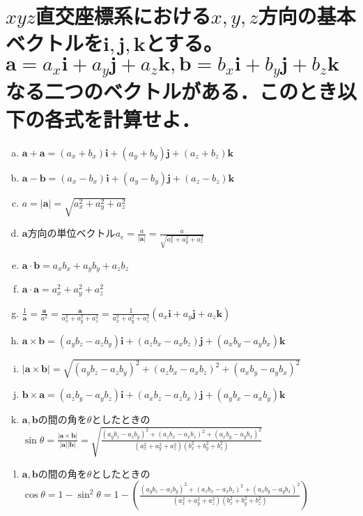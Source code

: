 \documentclass[dvipdfmx]{ujarticle}
\begin{document}
\section{$xyz$直交座標系における$x, y, z$方向の基本ベクトルを$\boldsymbol{i}, \boldsymbol{j}, \boldsymbol{k}$とする。$\boldsymbol{a}=a_{x}\boldsymbol{i}+a_{y}\boldsymbol{j}+a_{z}\boldsymbol{k}, \boldsymbol{b}=b_{x}\boldsymbol{i}+ b_{y}\boldsymbol{j}+ b_{z}\boldsymbol{k}$なる二つのベクトルがある．このとき以下の各式を計算せよ．}
\begin{enumerate}[(a)]
	\item $\boldsymbol{a}+\boldsymbol{a}=(a_{x}+b_{x})\boldsymbol{i}+(a_{y}+b_{y})\boldsymbol{j}+(a_{z}+b_{z})\boldsymbol{k}$
	\item $\boldsymbol{a}-\boldsymbol{b}=(a_{x}-b_{x})\boldsymbol{i}+(a_{y}-b_{y})\boldsymbol{j}+(a_{z}-b_{z})\boldsymbol{k}$
	\item $a=|\boldsymbol{a}|=\sqrt{a_{x}^{2}+a_{y}^{2}+a_{z}^{2}}$
	\item $\boldsymbol{a}$方向の単位ベクトル$a_{e}=\frac{a}{|\boldsymbol{a}|}=\frac{a}{\sqrt{a_{x}^{2}+a_{y}^{2}+a_{z}^{2}}}$
	\item $\boldsymbol{a}\cdot \boldsymbol{b}=a_{x}b_{x}+a_{y}b_{y}+a_{z}b_{z}$
	\item $\boldsymbol{a}\cdot \boldsymbol{a}=a_{x}^{2}+a_{y}^{2}+a_{z}^{2}$
	\item $\frac{1}{\boldsymbol{a}}=\frac{\boldsymbol{a}}{a^{2}}=\frac{\boldsymbol{a}}{a_{x}^{2}+a_{y}^{2}+a_{z}^{2}}=\frac{1}{a_{x}^{2}+a_{y}^{2}+a_{z}^{2}}(a_{x}\boldsymbol{i}+a_{y}\boldsymbol{j}+a_{z}\boldsymbol{k})$
	\item $\boldsymbol{a}\times \boldsymbol{b}=(a_{y}b_{z}-a_{z}b_{y})\boldsymbol{i}+(a_{z}b_{x}-a_{x}b_{z})\boldsymbol{j}+(a_{x}b_{y}-a_{y}b_{x})\boldsymbol{k}$
	\item $|\boldsymbol{a}\times \boldsymbol{b}|=\sqrt{(a_{y}b_{z}-a_{z}b_{y})^{2}+(a_{z}b_{x}-a_{x}b_{z})^{2}+(a_{x}b_{y}-a_{y}b_{x})^{2}}$
	\item $\boldsymbol{b}\times \boldsymbol{a}=(a_{z}b_{y}-a_{y}b_{z})\boldsymbol{i}+(a_{x}b_{z}-a_{z}b_{x})\boldsymbol{j}+(a_{y}b_{x}-a_{x}b_{y})\boldsymbol{k}$
	\item $\boldsymbol{a}, \boldsymbol{b}$の間の角を$\theta$としたときの$\sin \theta=\frac{|\boldsymbol{a}\times \boldsymbol{b}|}{|\boldsymbol{a}||\boldsymbol{b}|}=\sqrt{\frac{(a_{y}b_{z}-a_{z}b_{y})^{2}+(a_{z}b_{x}-a_{x}b_{z})^{2}+(a_{x}b_{y}-a_{y}b_{x})^{2}}{(a_{x}^{2}+a_{y}^{2}+a_{z}^{2})(b_{x}^{2}+b_{y}^{2}+b_{z}^{2})}}$
	\item $\boldsymbol{a}, \boldsymbol{b}$の間の角を$\theta$としたときの$\cos \theta=1-\sin^{2}\theta=1-\left(\frac{(a_{y}b_{z}-a_{z}b_{y})^{2}+(a_{z}b_{x}-a_{x}b_{z})^{2}+(a_{x}b_{y}-a_{y}b_{x})^{2}}{(a_{x}^{2}+a_{y}^{2}+a_{z}^{2})(b_{x}^{2}+b_{y}^{2}+b_{z}^{2})}\right)$
\end{enumerate}
\end{document}
